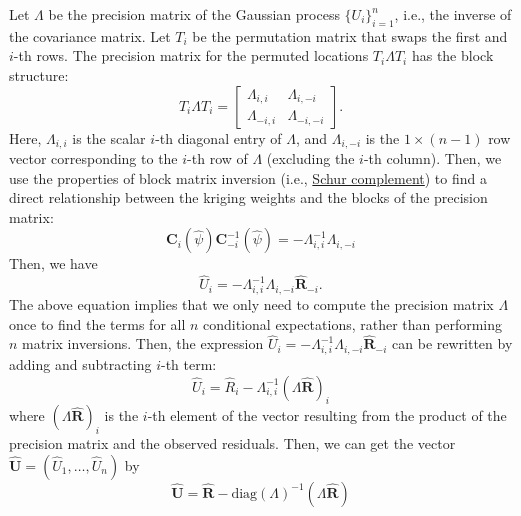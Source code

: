 \documentclass[12pt]{article}
\begin{document}
Let $\Lambda$ be the precision matrix of the Gaussian process $\{U_i\}_{i=1}^n$, i.e., the inverse of the covariance matrix. Let $T_i$ be the permutation matrix that swaps the first and $i$-th rows. The precision matrix for the permuted locations $T_i \Lambda T_i$ has the block structure:
$$ T_i \Lambda T_i = 
\left[
\begin{matrix}
    \Lambda_{i,i} & \Lambda_{i,-i}\\
    \Lambda_{-i,i} & \Lambda_{-i,-i}
\end{matrix}
\right].$$
Here, $\Lambda_{i,i}$ is the scalar $i$-th diagonal entry of $\Lambda$, and $\Lambda_{i,-i}$ is the $1 \times (n-1)$ row vector corresponding to the $i$-th row of $\Lambda$ (excluding the $i$-th column). Then, we use the properties of block matrix inversion (i.e., \href{https://en.wikipedia.org/wiki/Schur_complement}{Schur complement}) to find a direct relationship between the kriging weights and the blocks of the precision matrix: 
\begin{equation}\label{eq:schur_conditional}
   \mathbf{C}_{i}(\widehat\psi)\mathbf{C}^{-1}_{-i}(\widehat\psi) = -\Lambda_{i,i}^{-1}\Lambda_{i,-i} 
\end{equation}
Then, we have
$$\widehat U_i = -\Lambda_{i,i}^{-1}\Lambda_{i,-i} \widehat{\textbf{R}}_{-i}.$$
The above equation implies that we only need to compute the precision matrix $\Lambda$ once to find the terms for all $n$ conditional expectations, rather than performing $n$ matrix inversions. Then, the expression $\widehat U_i = -\Lambda_{i,i}^{-1}\Lambda_{i,-i} \widehat{\textbf{R}}_{-i}$ can be rewritten by adding and subtracting $i$-th term:
$$\widehat U_i = \widehat R_i -\Lambda_{i,i}^{-1}(\Lambda \widehat{\textbf{R}})_i$$
where $(\Lambda \widehat{\textbf{R}})_{i}$ is the $i$-th element of the vector resulting from the product of the precision matrix and the observed residuals. Then, we can get the vector $\widehat{\mathbf{U}} = (\widehat U_1,\ldots,\widehat U_n)$ by 
$$\widehat{\mathbf{U}} = \widehat{\mathbf{R}} - \text{diag}(\Lambda)^{-1}(\Lambda \widehat{\textbf{R}})$$




\end{document}
